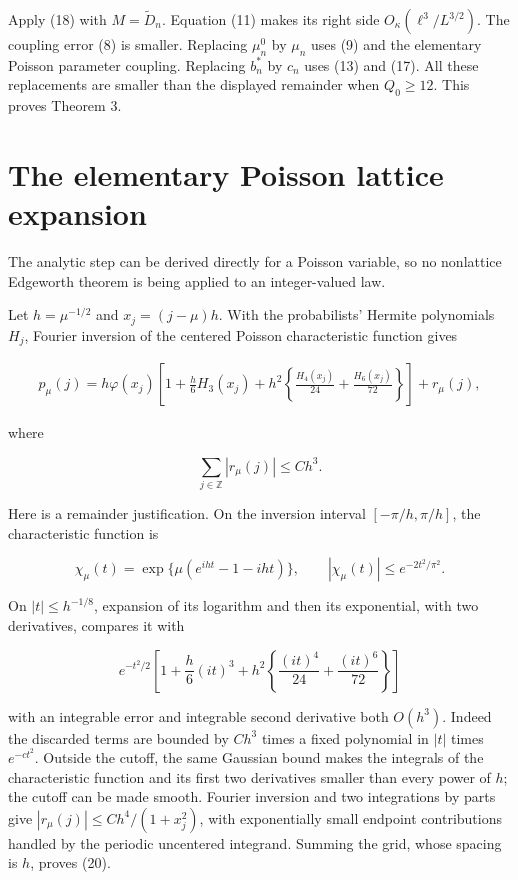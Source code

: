 \documentclass[
  11pt,
]{article}
\begin{document}
Apply (18) with \(M=\widetilde D_n\). Equation (11) makes its right side
\(O_\kappa(\ell^3/L^{3/2})\). The coupling error (8) is smaller.
Replacing \(\mu_n^0\) by \(\mu_n\) uses (9) and the elementary Poisson
parameter coupling. Replacing \(b_n^*\) by \(c_n\) uses (13) and (17).
All these replacements are smaller than the displayed remainder when
\(Q_0\ge12\). This proves Theorem 3.

\section{The elementary Poisson lattice
expansion}\label{the-elementary-poisson-lattice-expansion}

The analytic step can be derived directly for a Poisson variable, so no
nonlattice Edgeworth theorem is being applied to an integer-valued law.

Let \(h=\mu^{-1/2}\) and \(x_j=(j-\mu)h\). With the probabilists'
Hermite polynomials \(H_j\), Fourier inversion of the centered Poisson
characteristic function gives

\[
\begin{split}
p_\mu(j)=h\varphi(x_j)\left[
1+\frac h6H_3(x_j)
+h^2\left\{\frac{H_4(x_j)}{24}+\frac{H_6(x_j)}{72}\right\}
\right]+r_\mu(j),
\end{split}
\tag{19}
\]

where

\[
\sum_{j\in\mathbb Z}|r_\mu(j)|\le C h^3.
\tag{20}
\]

Here is a remainder justification. On the inversion interval
\([-\pi/h,\pi/h]\), the characteristic function is

\[
\chi_\mu(t)=\exp\{\mu(e^{iht}-1-iht)\},\qquad
|\chi_\mu(t)|\le e^{-2t^2/\pi^2}.
\]

On \(|t|\le h^{-1/8}\), expansion of its logarithm and then its
exponential, with two derivatives, compares it with

\[
e^{-t^2/2}\left[1+\frac h6(it)^3
+h^2\left\{\frac{(it)^4}{24}+\frac{(it)^6}{72}\right\}\right]
\]

with an integrable error and integrable second derivative both
\(O(h^3)\). Indeed the discarded terms are bounded by \(Ch^3\) times a
fixed polynomial in \(|t|\) times \(e^{-ct^2}\). Outside the cutoff, the
same Gaussian bound makes the integrals of the characteristic function
and its first two derivatives smaller than every power of \(h\); the
cutoff can be made smooth. Fourier inversion and two integrations by
parts give \(|r_\mu(j)|\le Ch^4/(1+x_j^2)\), with exponentially small
endpoint contributions handled by the periodic uncentered integrand.
Summing the grid, whose spacing is \(h\), proves (20).
\end{document}
